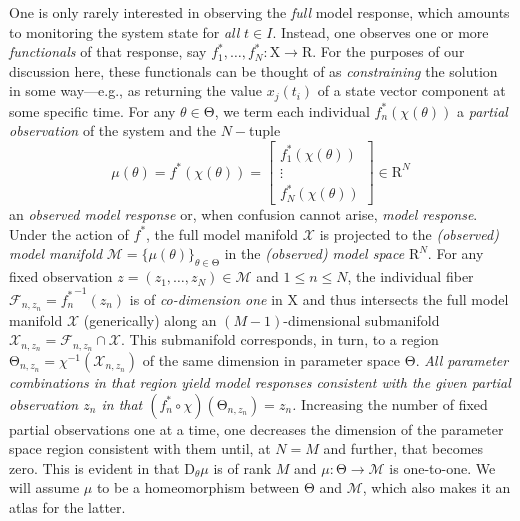 \documentclass{article}
\newcommand{\D}{\mathrm{D}}
\newcommand{\p}{\theta}
\newcommand{\fmr}{\chi}
\newcommand{\fmm}{\mathcal{X}}
\newcommand{\fiber}{\mathcal{F}}
\newcommand{\omr}{\mu}
\newcommand{\omm}{\mathcal{M}}
\newcommand{\R}{\mathrm{R}}
\newcommand{\ps}{\mathrm{\Theta}}
\newcommand{\fms}{\mathrm{X}}
\begin{document}
One is only rarely interested in observing the \emph{full} model response,
which amounts to monitoring the system state for \emph{all} $t \in I$.
Instead, one observes one or more \emph{functionals} of that response, say $f^*_1 , \ldots , f^*_N : \fms \to \R$.
For the purposes of our discussion here,
these functionals can be thought of as \emph{constraining} the solution
in some way---e.g., as returning the value $x_j(t_i)$
of a state vector component at some specific time.
For any $\p\in\ps$, we term each individual $f^*_n(\fmr(\p))$
a \emph{partial observation} of the system and the $N-$tuple
%
\[
 \mu(\p)
=
 f^*(\fmr(\p))
=
\left[\begin{array}{c}
 f^*_1(\fmr(\p)) \\ \vdots \\ f^*_N(\fmr(\p))
\end{array}\right]
\in
 \R^N
\]
%
an \emph{observed model response} or, when confusion cannot arise, \emph{model response}.
Under the action of $f^*$,
the full model manifold $\fmm$ is projected to
the \emph{(observed) model manifold} $\omm = \{ \omr(\p) \}_{\p \in \ps}$
in the \emph{(observed) model space} $\R^N$.
For any fixed observation $z = (z_1,\ldots,z_N) \in \omm$ and $1 \le n \le N$,
the individual fiber $\fiber_{n,z_n} = {f^*_n}^{-1}(z_n)$
is of \emph{co-dimension one} in $\fms$
and thus intersects the full model manifold $\fmm$ (generically) along
an $(M-1)$-dimensional submanifold $\fmm_{n,z_n} = \fiber_{n,z_n} \cap \fmm$.
This submanifold corresponds, in turn, to a region
$\ps_{n,z_n} = \fmr^{-1}(\fmm_{n,z_n})$ of the same dimension
in parameter space $\ps$.
\emph{All parameter combinations in that region yield model responses
consistent with the given partial observation $z_n$
in that $(f^*_n\circ\fmr)(\ps_{n,z_n}) = z_n$.}
Increasing the number of fixed partial observations one at a time,
one decreases the dimension of the parameter space region consistent with them until,
at $N=M$ and further, that becomes zero.
This is evident in that $\D_\p \omr$ is of rank $M$
and $\omr : \ps \to \omm$ is one-to-one.
We will assume $\omr$ to be a homeomorphism between $\ps$ and $\omm$,
which also makes it an atlas for the latter.
\end{document}
